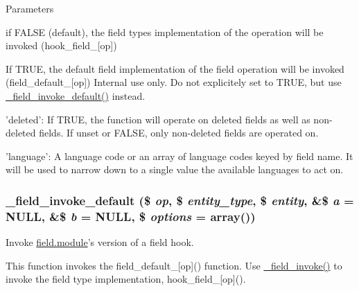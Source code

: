 \begin{DoxyParams}{Parameters}
\begin{DoxyItemize}
\begin{DoxyItemize}
\item if FALSE (default), the field types implementation of the operation will be invoked (hook\_\-field\_\-\mbox{[}op\mbox{]})
\item If TRUE, the default field implementation of the field operation will be invoked (field\_\-default\_\-\mbox{[}op\mbox{]}) Internal use only. Do not explicitely set to TRUE, but use \hyperlink{group__field__attach_gaf000872e1850750f98445dfa96bfb602}{\_\-field\_\-invoke\_\-default()} instead.
\end{DoxyItemize}
\item 'deleted': If TRUE, the function will operate on deleted fields as well as non-\/deleted fields. If unset or FALSE, only non-\/deleted fields are operated on.
\item 'language': A language code or an array of language codes keyed by field name. It will be used to narrow down to a single value the available languages to act on. 
\end{DoxyItemize}\end{DoxyParams}
\hypertarget{group__field__attach_gaf000872e1850750f98445dfa96bfb602}{
\subsubsection[{\_\-field\_\-invoke\_\-default}]{\setlength{\rightskip}{0pt plus 5cm}\_\-field\_\-invoke\_\-default (\$ {\em op}, \/  \$ {\em entity\_\-type}, \/  \$ {\em entity}, \/  \&\$ {\em a} = {\ttfamily NULL}, \/  \&\$ {\em b} = {\ttfamily NULL}, \/  \$ {\em options} = {\ttfamily array()})}}
\label{group__field__attach_gaf000872e1850750f98445dfa96bfb602}
Invoke \hyperlink{field_8module}{field.module}'s version of a field hook.

This function invokes the field\_\-default\_\-\mbox{[}op\mbox{]}() function. Use \hyperlink{group__field__attach_ga65f891a5eea6513f8505f5cfc5894896}{\_\-field\_\-invoke()} to invoke the field type implementation, hook\_\-field\_\-\mbox{[}op\mbox{]}().

